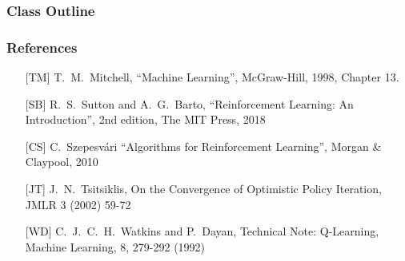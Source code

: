         \title[\whatshort, \simplenum, 
Slide \insertframenumber/\inserttotalframenumber ] {\what}

 

\subtitle{Class \simplenum: Reinforcement Learning}


\usepackage{graphicx}



\begin{frame}
  \titlepage

\end{frame}

\begin{frame}
  \frametitle{Class Outline} \tableofcontents %
\end{frame}




\begin{frame}[fragile]
\frametitle{References}

\begin{itemize}

\item[[TM{]}] T.~M.~Mitchell, ``Machine Learning'', McGraw-Hill, 1998,
  Chapter 13.

\item[[SB{]}] R.~S.~Sutton and A.~G.~Barto, 
``Reinforcement Learning: An Introduction'', 2nd edition, The MIT
Press, 2018

\item[[CS{]}]  C.~Szepesv\'ari
``Algorithms for Reinforcement Learning'', Morgan \& Claypool, 2010

\item[[JT{]}] J.~N.~Tsitsiklis, On the Convergence of Optimistic Policy
Iteration, JMLR 3 (2002) 59-72

\item[[WD{]}] C.~J.~C.~H.~Watkins and P.~Dayan, Technical Note:
Q-Learning, Machine Learning, 8, 279-292 (1992)

\end{itemize}
\end{frame}


